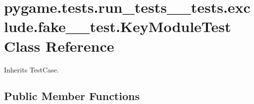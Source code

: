 \hypertarget{classpygame_1_1tests_1_1run__tests____tests_1_1exclude_1_1fake__2__test_1_1_key_module_test}{}\section{pygame.\+tests.\+run\+\_\+tests\+\_\+\+\_\+tests.\+exclude.\+fake\+\_\+\_\+test.\+Key\+Module\+Test Class Reference}
\label{classpygame_1_1tests_1_1run__tests____tests_1_1exclude_1_1fake__2__test_1_1_key_module_test}


Inherits Test\+Case.

\subsection*{Public Member Functions}
